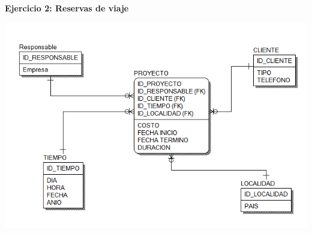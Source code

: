 \begin{flushleft}
\begin{itemize}
\textbf{ }\\
\textbf{ }\\
\textbf{ }\\
\textbf{ }\\
\textbf{ }\\
\textbf{ }\\
\textbf{ }\\
\textbf{ }\\
\textbf{ }\\
\textbf{Ejercicio 2: Reservas de viaje }\\
\begin{center}
	\includegraphics[width=17cm]{./Imagenes/image2} 
	\end{center}
\textbf{ }\\
\textbf{ }\\
\textbf{ }\\
\textbf{ }\\
\textbf{ }\\
\textbf{ }\\
\textbf{ }\\
\textbf{ }\\
\textbf{ }\\

\textbf{ }\\
\textbf{ }\\
\textbf{ }\\
\textbf{ }\\
\textbf{ }\\
\textbf{ }\\
\textbf{ }\\
\textbf{ }\\
\textbf{ }\\


\end{itemize}
\end{flushleft}
